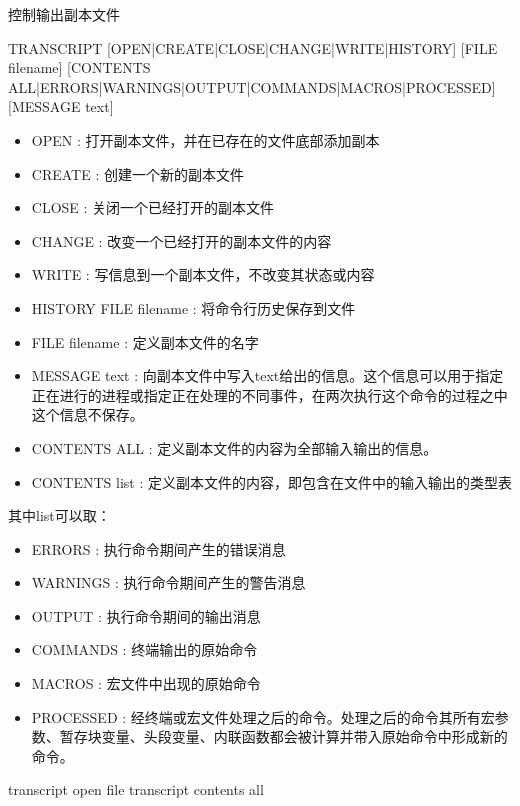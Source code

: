 \label{cmd:transcript}

控制输出副本文件

\begin{SACSTX}
TRANSCRIPT [OPEN|CREATE|CLOSE|CHANGE|WRITE|HISTORY] [FILE filename]  
    [CONTENTS ALL|ERRORS|WARNINGS|OUTPUT|COMMANDS|MACROS|PROCESSED] 
    [MESSAGE text]
\end{SACSTX}

\begin{itemize}
\item OPEN : 打开副本文件，并在已存在的文件底部添加副本 
\item CREATE : 创建一个新的副本文件 
\item CLOSE : 关闭一个已经打开的副本文件 
\item CHANGE : 改变一个已经打开的副本文件的内容 
\item WRITE : 写信息到一个副本文件，不改变其状态或内容 
\item HISTORY FILE filename : 将命令行历史保存到文件 
\item FILE filename : 定义副本文件的名字 
\item MESSAGE text : 向副本文件中写入text给出的信息。这个信息可以用于指定正在进行的进程或指定正在处理的不同事件，在两次执行这个命令的过程之中这个信息不保存。 
\item CONTENTS ALL : 定义副本文件的内容为全部输入输出的信息。 
\item CONTENTS list : 定义副本文件的内容，即包含在文件中的输入输出的类型表
\end{itemize}
其中list可以取：
\begin{itemize}
\item ERRORS : 执行命令期间产生的错误消息
\item WARNINGS : 执行命令期间产生的警告消息
\item OUTPUT : 执行命令期间的输出消息 
\item COMMANDS : 终端输出的原始命令 
\item MACROS : 宏文件中出现的原始命令 
\item PROCESSED : 经终端或宏文件处理之后的命令。处理之后的命令其所有宏参数、暂存块变量、头段变量、内联函数都会被计算并带入原始命令中形成新的命令。\\
\end{itemize}

\begin{SACDFT}
transcript open file transcript contents all
\end{SACDFT}

